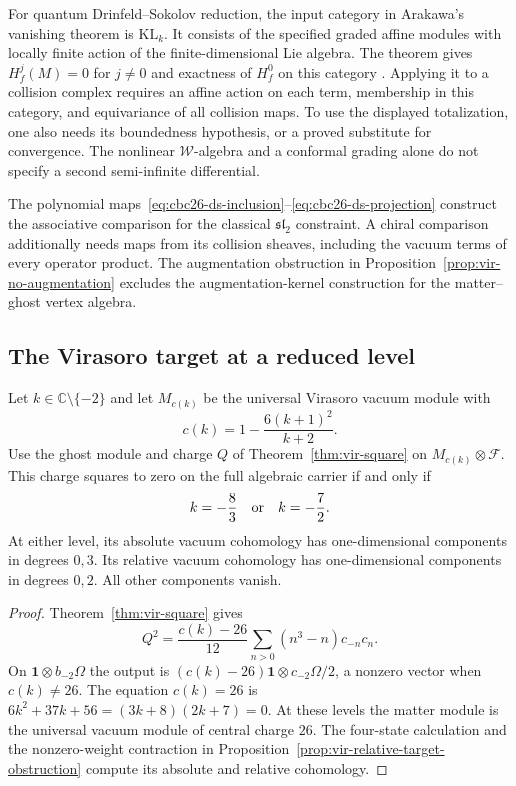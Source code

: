 For quantum Drinfeld--Sokolov reduction, the input category in Arakawa's vanishing theorem is $\mathrm{KL}_k$.
It consists of the specified graded affine modules with locally finite action of the finite-dimensional Lie algebra.
The theorem gives $H_f^j(M)=0$ for $j\ne0$ and exactness of $H_f^0$ on this category \cite[\S6, p.~585; Theorem~7.1(i), p.~588]{Ara15}.
Applying it to a collision complex requires an affine action on each term, membership in this category, and equivariance of all collision maps.
To use the displayed totalization, one also needs its boundedness hypothesis, or a proved substitute for convergence.
The nonlinear $\mathcal W$-algebra and a conformal grading alone do not specify a second semi-infinite differential.

The polynomial maps~\eqref{eq:cbc26-ds-inclusion}--\eqref{eq:cbc26-ds-projection} construct the associative comparison for the classical $\mathfrak{sl}_2$ constraint.
A chiral comparison additionally needs maps from its collision sheaves, including the vacuum terms of every operator product.
The augmentation obstruction in Proposition~\ref{prop:vir-no-augmentation} excludes the augmentation-kernel construction for the matter--ghost vertex algebra.

\subsection{The Virasoro target at a reduced level}

\begin{corollary}
\label{cor:virasoro-semi-infinite}
Let $k\in\mathbb C\setminus\{-2\}$ and let $M_{c(k)}$ be the universal Virasoro vacuum module with
\[
 c(k)=1-\frac{6(k+1)^2}{k+2}.
\]
Use the ghost module and charge $Q$ of Theorem~\ref{thm:vir-square} on $M_{c(k)}\otimes\mathcal F$.
This charge squares to zero on the full algebraic carrier if and only if
\[
 k=-\frac83\quad\hbox{or}\quad k=-\frac72.
\]
At either level, its absolute vacuum cohomology has one-dimensional components in degrees $0,3$.
Its relative vacuum cohomology has one-dimensional components in degrees $0,2$.
All other components vanish.
\end{corollary}

\begin{proof}
Theorem~\ref{thm:vir-square} gives
\[
 Q^2=\frac{c(k)-26}{12}\sum_{n>0}(n^3-n)c_{-n}c_n.
\]
On $\mathbf1\otimes b_{-2}\Omega$ the output is
$(c(k)-26)\mathbf1\otimes c_{-2}\Omega/2$, a nonzero vector when $c(k)\ne26$.
The equation $c(k)=26$ is $6k^2+37k+56=(3k+8)(2k+7)=0$.
At these levels the matter module is the universal vacuum module of central charge $26$.
The four-state calculation and the nonzero-weight contraction in Proposition~\ref{prop:vir-relative-target-obstruction} compute its absolute and relative cohomology.
\end{proof}

